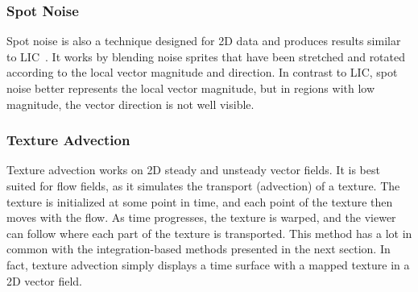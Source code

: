 %
\subsubsection{Spot Noise}
%
Spot noise is also a technique designed for \ac{2D} data and produces results
similar to \ac{LIC}~\cite{Wijk1991,Leeuw1995}.
%
It works by blending noise sprites that have been stretched and rotated
according to the local vector magnitude and direction.
%
In contrast to \ac{LIC}, spot noise better represents the local vector
magnitude, but in regions with low magnitude, the vector direction is not well
visible.
%

%
\subsubsection{Texture Advection}
%
Texture advection works on \ac{2D} steady and unsteady vector fields.
%
It is best suited for flow fields, as it simulates the transport (advection) of
a texture.
%
The texture is initialized at some point in time, and each point of the texture
then moves with the flow.
%
As time progresses, the texture is warped, and the viewer can follow where each
part of the texture is transported.
%
This method has a lot in common with the integration-based methods presented in
the next section.
%
In fact, texture advection simply displays a time surface with a mapped texture
in a \ac{2D} vector field.
%

%
%
